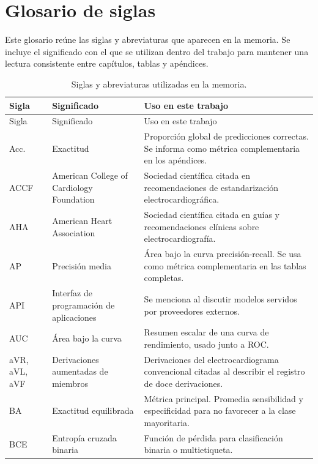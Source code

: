 \chapter*{Glosario de siglas}

Este glosario reúne las siglas y abreviaturas que aparecen en la memoria. Se incluye el significado con el que se utilizan dentro del trabajo para mantener una lectura consistente entre capítulos, tablas y apéndices.

{\small
\begin{longtable}{@{}>{\raggedright\arraybackslash}p{2.20cm}>{\raggedright\arraybackslash}p{4.10cm}>{\raggedright\arraybackslash}p{7.95cm}@{}}
\caption{Siglas y abreviaturas utilizadas en la memoria.}
\label{tab:glosario_siglas}\\
\toprule
Sigla & Significado & Uso en este trabajo \\
\midrule
\endfirsthead
\toprule
Sigla & Significado & Uso en este trabajo \\
\midrule
\endhead
\bottomrule
\endfoot
Acc. & Exactitud & Proporción global de predicciones correctas. Se informa como métrica complementaria en los apéndices. \\
ACCF & American College of Cardiology Foundation & Sociedad científica citada en recomendaciones de estandarización electrocardiográfica. \\
AHA & American Heart Association & Sociedad científica citada en guías y recomendaciones clínicas sobre electrocardiografía. \\
AP & Precisión media & Área bajo la curva precisión-recall. Se usa como métrica complementaria en las tablas completas. \\
API & Interfaz de programación de aplicaciones & Se menciona al discutir modelos servidos por proveedores externos. \\
AUC & Área bajo la curva & Resumen escalar de una curva de rendimiento, usado junto a ROC. \\
aVR, aVL, aVF & Derivaciones aumentadas de miembros & Derivaciones del electrocardiograma convencional citadas al describir el registro de doce derivaciones. \\
BA & Exactitud equilibrada & Métrica principal. Promedia sensibilidad y especificidad para no favorecer a la clase mayoritaria. \\
BCE & Entropía cruzada binaria & Función de pérdida para clasificación binaria o multietiqueta. \\

\end{longtable}}

